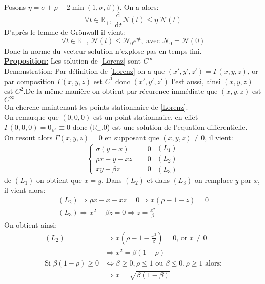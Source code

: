 \documentclass{article}
\newcommand{\R}{\mathbb{R}}
\newcommand{\deriv}[3][ ]{
    \ensuremath{\frac{\mathrm{d}^{#1}#2}{\mathrm{d}^{#1} #3}}
}
\begin{document}
Posons $ \eta = \sigma + \rho - 2 \min (1,\sigma,\beta))$. On a alors: 
\[
    \forall t \in \R_+, \  \deriv{}{t}\mathcal{N}(t) \le \eta\  \mathcal{N}(t)
\]
D'après le lemme de Grönwall il vient:
\[
    \forall t \in \R_+,\  \mathcal{N}(t) \le \mathcal{N}_0 e^{\eta t},\  \textrm{avec } \mathcal{N}_0 = \mathcal{N}(0)
\]
Donc la norme du vecteur solution n'explose pas en temps fini.\\

\underline{\textbf{Proposition:}} Les solution de \eqref{Lorenz} sont $C^\infty$\\
Demonstration:
 Par définition de \eqref{Lorenz} on a que $(x',y',z') = \Gamma(x,y,z)$, or par composition $\Gamma(x,y,z)$ est $C^1$ donc $(x',y',z')$ l'est aussi, ainsi $(x,y,z)$ est $C^2$.De la même manière on obtient par récurence immédiate que $(x,y,z)$ est $C^\infty$\\

On cherche maintenant les points stationnaire de \eqref{Lorenz}.\\
On remarque que $(0,0,0)$ est un point stationnaire, en effet $\Gamma(0,0,0) = 0_{\R^3} \equiv 0$ donc ($\R_+$,0) est une solution de l'equation differentielle.\\
On resout alors $\Gamma(x,y,z)=0$ en supposant que $(x,y,z) \neq 0$, il vient:
\[
\left\{\begin{array}{rl} %
     \sigma(y-x)&=0  \\
     \rho x -y -xz&=0\\
     xy - \beta z&=0
\end{array}\right.
\begin{array}{c} %
    (L_1)\\
    (L_2)\\
    (L_3)
\end{array}
\]
de $(L_1)$ on obtient que $x=y$. Dans $(L_2)$ et dans $(L_3)$ on remplace $y$ par $x$, il vient alors:
\begin{gather*}
    (L_2) \Rightarrow \rho x - x - xz = 0 \Rightarrow x (\rho -1 -z ) = 0 \\
    (L_3) \Rightarrow x^2 - \beta z = 0 \Rightarrow z = \frac{x^2}{\beta}
\end{gather*}
On obtient ainsi:
\begin{align*}
    (L_2) & \Rightarrow x (\rho - 1 - \frac{x^2}{\beta}) = 0 \text{, or }x \neq 0\\
        & \Rightarrow x^2 = \beta (1-\rho)\\
    \text{Si } \beta(1-\rho) \ge 0 & \Leftrightarrow \beta \ge 0,\rho\le 1 \text{ ou } \beta \le 0,\rho\ge 1\text{ alors:}\\
    &\Rightarrow x = \sqrt{\beta(1-\beta)}
\end{align*}
\end{document}
